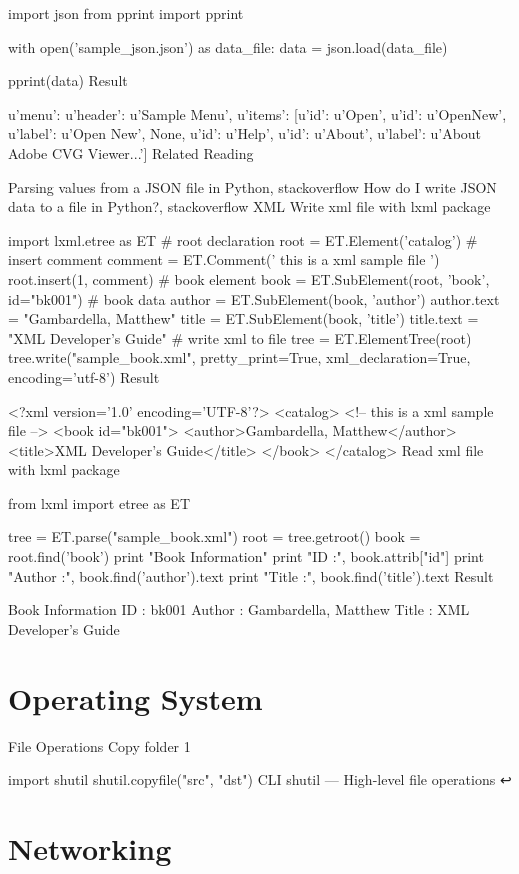 import json
from pprint import pprint

with open('sample_json.json') as data_file:
    data = json.load(data_file)

pprint(data)
Result

{u'menu': {u'header': u'Sample Menu',
           u'items': [{u'id': u'Open'},
                      {u'id': u'OpenNew', u'label': u'Open New'},
                      None,
                      {u'id': u'Help'},
                      {u'id': u'About',
                       u'label': u'About Adobe CVG Viewer...'}]}}
Related Reading

Parsing values from a JSON file in Python, stackoverflow
How do I write JSON data to a file in Python?, stackoverflow
XML
Write xml file with lxml package

import lxml.etree as ET
# root declaration
root = ET.Element('catalog')
# insert comment
comment = ET.Comment(' this is a xml sample file ')
root.insert(1, comment)
# book element
book = ET.SubElement(root, 'book', id="bk001")
# book data
author = ET.SubElement(book, 'author')
author.text = "Gambardella, Matthew"
title = ET.SubElement(book, 'title')
title.text = "XML Developer's Guide"
# write xml to file
tree = ET.ElementTree(root)
tree.write("sample_book.xml", pretty_print=True, xml_declaration=True, encoding='utf-8')
Result

<?xml version='1.0' encoding='UTF-8'?>
<catalog>
  <!-- this is a xml sample file -->
  <book id="bk001">
    <author>Gambardella, Matthew</author>
    <title>XML Developer's Guide</title>
  </book>
</catalog>
Read xml file with lxml package

from lxml import etree as ET

tree = ET.parse("sample_book.xml")
root = tree.getroot()
book = root.find('book')
print "Book Information"
print "ID     :", book.attrib["id"]
print "Author :", book.find('author').text
print "Title  :", book.find('title').text
Result

Book Information
ID     : bk001
Author : Gambardella, Matthew
Title  : XML Developer's Guide

\section{Operating System}

File Operations
Copy folder 1

import shutil
shutil.copyfile("src", "dst")
CLI
shutil — High-level file operations ↩

\section{Networking}


